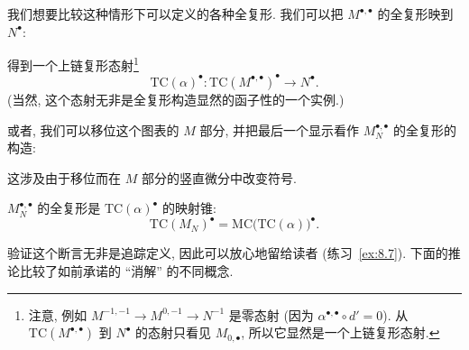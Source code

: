 我们想要比较这种情形下可以定义的各种全复形. 我们可以把 $M^{\bullet,\bullet}$ 的全复形映到 $N^\bullet$:
\begin{center}
\end{center}
得到一个上链复形态射\footnote{注意, 例如 $M^{-1,-1}\to M^{0,-1}\to N^{-1}$ 是零态射 (因为 $\alpha^{\bullet,\bullet}\circ d'=0$). 从 $\mathrm{TC}(M^{\bullet,\bullet})$ 到 $N^\bullet$ 的态射只看见 $M_{0,\bullet}$, 所以它显然是一个上链复形态射.}
\[
\mathrm{TC}(\alpha)^\bullet:\mathrm{TC}(M^{\bullet,\bullet})^\bullet \longrightarrow N^\bullet.
\]
(当然, 这个态射无非是全复形构造显然的函子性的一个实例.)

或者, 我们可以移位这个图表的 $M$ 部分, 并把最后一个显示看作 $M_{N}^{\bullet,\bullet}$ 的全复形的构造:
\begin{center}
\end{center}
这涉及由于移位而在 $M$ 部分的竖直微分中改变符号.

\begin{claim}\label{claim:8.11-mapping-cone}
$M_N^{\bullet,\bullet}$ 的全复形是 $\mathrm{TC}(\alpha)^\bullet$ 的映射锥:
\[
\mathrm{TC}(M_N)^{\bullet}=\mathrm{MC}\bigl(\mathrm{TC}(\alpha)\bigr)^{\bullet}.
\]
\end{claim}

验证这个断言无非是追踪定义, 因此可以放心地留给读者 (练习~\ref{ex:8.7}). 下面的推论比较了如前承诺的 ``消解'' 的不同概念.

